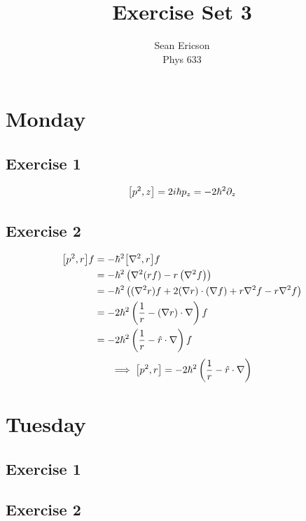 \documentclass[12pt]{article}
\begin{document}
	
\title{Exercise Set 3}
\author{Sean Ericson \\ Phys 633}
\maketitle

\section*{Monday}
\subsection*{Exercise 1}
\[ \comm{p^2}{z} = 2i\hbar p_z = -2\hbar^2\partial_z \]

\subsection*{Exercise 2}
\begin{align*}
    \comm{p^2}{r}f &= -\hbar^2\comm{\nabla^2}{r}f \\
    &= -\hbar^2\left(\nabla^2(rf) - r\left(\nabla^2f\right)\right) \\
    &= -\hbar^2\left((\nabla^2r)f + 2(\nabla r)\cdot(\nabla f) + r\nabla^2f - r\nabla^2 f\right) \\
    &= -2\hbar^2\left(\frac{1}{r} - (\nabla r)\cdot\nabla\right)f \\
    &= -2\hbar^2\left(\frac{1}{r} - \hat{r}\cdot\nabla\right)f
\end{align*}
\[ \implies \comm{p^2}{r} = -2\hbar^2\left(\frac{1}{r} - \hat{r}\cdot\nabla\right) \]

\section*{Tuesday}
\subsection*{Exercise 1}


\subsection*{Exercise 2}
\end{document}
